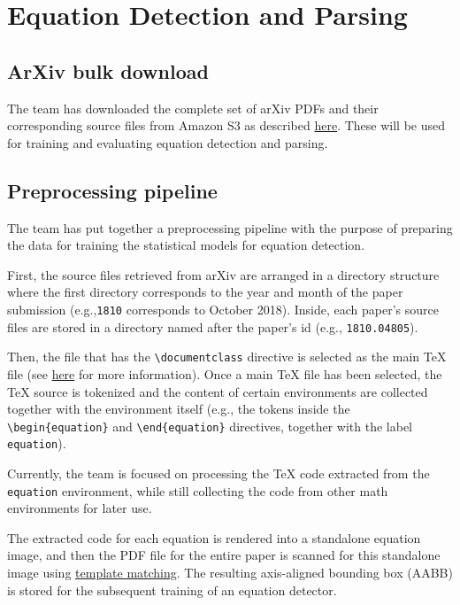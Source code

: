 \documentclass[article, 12pt, oneside]{memoir}
\begin{document}
\hypertarget{equation-detection-and-parsing}{%
\section{Equation Detection and
Parsing}\label{equation-detection-and-parsing}}

\hypertarget{arxiv-bulk-download}{%
\subsection{ArXiv bulk download}\label{arxiv-bulk-download}}

The team has downloaded the complete set of arXiv PDFs and their
corresponding source files from Amazon S3 as described
\href{https://arxiv.org/help/bulk_data_s3}{here}. These will be used for
training and evaluating equation detection and parsing.

\hypertarget{preprocessing-pipeline}{%
\subsection{Preprocessing pipeline}\label{preprocessing-pipeline}}

The team has put together a preprocessing pipeline with the purpose of
preparing the data for training the statistical models for equation
detection.

First, the source files retrieved from arXiv are arranged in a directory
structure where the first directory corresponds to the year and month of
the paper submission (e.g.,\texttt{1810} corresponds to October 2018).
Inside, each paper's source files are stored in a directory named after
the paper's id (e.g., \texttt{1810.04805}).

Then, the file that has the \texttt{\textbackslash{}documentclass}
directive is selected as the main TeX file (see
\href{https://arxiv.org/help/faq/mistakes\#wrongtex}{here} for more
information). Once a main TeX file has been selected, the TeX source is
tokenized and the content of certain environments are collected together
with the environment itself (e.g., the tokens inside the
\texttt{\textbackslash{}begin\{equation\}} and
\texttt{\textbackslash{}end\{equation\}} directives, together with the
label \texttt{equation}).

Currently, the team is focused on processing the TeX code extracted from
the \texttt{equation} environment, while still collecting the code from
other math environments for later use.

The extracted code for each equation is rendered into a standalone
equation image, and then the PDF file for the entire paper is scanned
for this standalone image using
\href{https://docs.opencv.org/4.0.0/df/dfb/group__imgproc__object.html}{template
matching}. The resulting axis-aligned bounding box (AABB) is stored for
the subsequent training of an equation detector.
\end{document}
